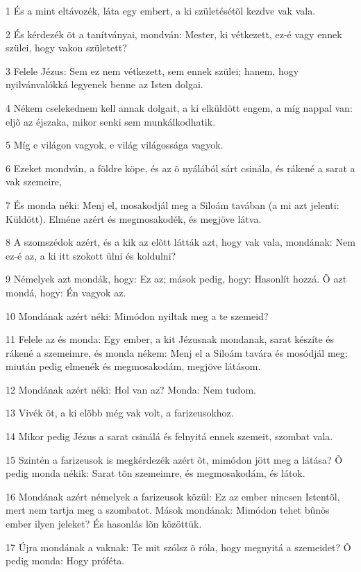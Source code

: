 \par 1 És a mint eltávozék, láta egy embert, a ki születésétõl kezdve vak vala.
\par 2 És kérdezék õt a tanítványai, mondván: Mester, ki vétkezett, ez-é vagy ennek szülei, hogy vakon született?
\par 3 Felele Jézus: Sem ez nem vétkezett, sem ennek szülei; hanem, hogy nyilvánvalókká legyenek benne az Isten dolgai.
\par 4 Nékem cselekednem kell annak dolgait, a ki elküldött engem, a míg nappal van: eljõ az éjszaka, mikor senki sem munkálkodhatik.
\par 5 Míg e világon vagyok, e világ világossága vagyok.
\par 6 Ezeket mondván, a földre köpe, és az õ nyálából sárt csinála, és rákené a sarat a vak szemeire,
\par 7 És monda néki: Menj el, mosakodjál meg a Siloám tavában (a mi azt jelenti: Küldött). Elméne azért és megmosakodék, és megjöve látva.
\par 8 A szomszédok azért, és a kik az elõtt látták azt, hogy vak vala, mondának: Nem ez-é az, a ki itt szokott ülni és koldulni?
\par 9 Némelyek azt mondák, hogy: Ez az; mások pedig, hogy: Hasonlít hozzá. Õ azt mondá, hogy: Én vagyok az.
\par 10 Mondának azért néki: Mimódon nyiltak meg a te szemeid?
\par 11 Felele az és monda: Egy ember, a kit Jézusnak mondanak, sarat készíte és rákené a szemeimre, és monda nékem: Menj el a Siloám tavára és mosódjál meg; miután pedig elmenék és megmosakodám, megjöve látásom.
\par 12 Mondának azért néki: Hol van az? Monda: Nem tudom.
\par 13 Vivék õt, a ki elõbb még vak volt, a farizeusokhoz.
\par 14 Mikor pedig Jézus a sarat csinálá és felnyitá ennek szemeit, szombat vala.
\par 15 Szintén a farizeusok is megkérdezék azért õt, mimódon jött meg a látása? Õ pedig monda nékik: Sarat tõn szemeimre, és megmosakodám, és látok.
\par 16 Mondának azért némelyek a farizeusok közül: Ez az ember nincsen Istentõl, mert nem tartja meg a szombatot. Mások mondának: Mimódon tehet bûnös ember ilyen jeleket? És hasonlás lõn közöttük.
\par 17 Újra mondának a vaknak: Te mit szólsz õ róla, hogy megnyitá a szemeidet? Õ pedig monda: Hogy próféta.
